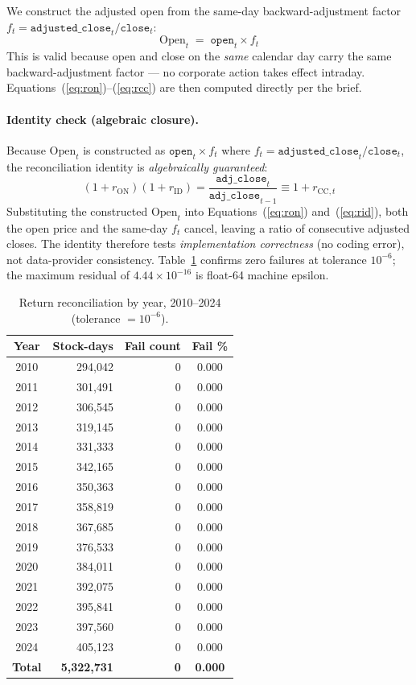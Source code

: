 \documentclass[12pt,a4paper]{article}
\begin{document}
We construct the adjusted open from the same-day backward-adjustment factor
$f_t = \texttt{adjusted\_close}_t / \texttt{close}_t$:
\[
\text{Open}_t \;=\; \texttt{open}_t \times f_t
\]
This is valid because open and close on the \emph{same} calendar day carry the
same backward-adjustment factor --- no corporate action takes effect intraday.
Equations~(\ref{eq:ron})--(\ref{eq:rcc}) are then computed directly per the brief.

\paragraph{Identity check (algebraic closure).}
Because $\text{Open}_t$ is constructed as $\texttt{open}_t \times f_t$ where
$f_t = \texttt{adjusted\_close}_t / \texttt{close}_t$, the reconciliation
identity is \emph{algebraically guaranteed}:
\[
(1+r_{\text{ON}})(1+r_{\text{ID}})
= \frac{\texttt{adj\_close}_t}{\texttt{adj\_close}_{t-1}}
\equiv 1 + r_{\text{CC},t}
\]
Substituting the constructed $\text{Open}_t$ into Equations~(\ref{eq:ron}) and~(\ref{eq:rid}), both the open price and the same-day $f_t$ cancel, leaving a ratio of consecutive adjusted closes.
The identity therefore tests \emph{implementation correctness} (no coding error),
not data-provider consistency.
Table~\ref{tab:reconcile} confirms zero failures at tolerance $10^{-6}$;
the maximum residual of $4.44\times10^{-16}$ is float-64 machine epsilon.

\begin{table}[H]
\centering
\caption{Return reconciliation by year, 2010--2024 (tolerance $= 10^{-6}$).}
\label{tab:reconcile}
\begin{tabular}{crrc}
\toprule
Year & Stock-days & Fail count & Fail \% \\
\midrule
2010 & 294,042 & 0 & 0.000 \\
2011 & 301,491 & 0 & 0.000 \\
2012 & 306,545 & 0 & 0.000 \\
2013 & 319,145 & 0 & 0.000 \\
2014 & 331,333 & 0 & 0.000 \\
2015 & 342,165 & 0 & 0.000 \\
2016 & 350,363 & 0 & 0.000 \\
2017 & 358,819 & 0 & 0.000 \\
2018 & 367,685 & 0 & 0.000 \\
2019 & 376,533 & 0 & 0.000 \\
2020 & 384,011 & 0 & 0.000 \\
2021 & 392,075 & 0 & 0.000 \\
2022 & 395,841 & 0 & 0.000 \\
2023 & 397,560 & 0 & 0.000 \\
2024 & 405,123 & 0 & 0.000 \\
\midrule
\textbf{Total} & \textbf{5,322,731} & \textbf{0} & \textbf{0.000} \\
\bottomrule
\end{tabular}
\end{table}
\end{document}
